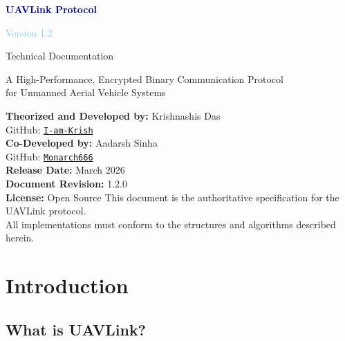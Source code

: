 \documentclass[11pt,a4paper]{article}
\begin{document}
\begin{titlepage}
    \centering
    \vspace*{2cm}
    {\Huge\bfseries\textcolor{darkblue}{UAVLink Protocol}\par}
    \vspace{0.5cm}
    {\LARGE\textcolor{skyblue}{Version 1.2}\par}
    \vspace{0.3cm}
    {\large\textcolor{codegray}{Technical Documentation}\par}
    \vspace{2cm}
    {\large A High-Performance, Encrypted Binary Communication Protocol\\for Unmanned Aerial Vehicle Systems\par}
    \vspace{3cm}
    {\normalsize
    \textbf{Theorized and Developed by:} Krishnashis Das\\
    GitHub: \href{https://github.com/I-am-Krish}{\texttt{I-am-Krish}}\\[1em]
    \textbf{Co-Developed by:} Aadarsh Sinha\\
    GitHub: \href{https://github.com/Monarch666}{\texttt{Monarch666}}\\[2em]
    \textbf{Release Date:} March 2026\\
    \textbf{Document Revision:} 1.2.0\\
    \textbf{License:} Open Source
    }
    \vfill
    {\footnotesize\textcolor{codegray}{This document is the authoritative specification for the UAVLink protocol.\\All implementations must conform to the structures and algorithms described herein.}}
\end{titlepage}

\tableofcontents
\newpage

\section{Introduction}

\subsection{What is UAVLink?}
\end{document}
